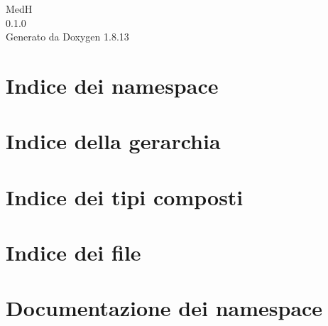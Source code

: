 \documentclass[twoside]{book}
\newcommand{\+}{\discretionary{\mbox{\scriptsize$\hookleftarrow$}}{}{}}
\newcommand{\clearemptydoublepage}{%
  \newpage{\pagestyle{empty}\cleardoublepage}%
}
\begin{document}
\hypersetup{pageanchor=false,
             bookmarksnumbered=true,
             pdfencoding=unicode
            }
\begin{titlepage}
\vspace*{7cm}
\begin{center}%
{\Large MedH \\[1ex]\large 0.\+1.\+0 }\\
\vspace*{1cm}
{\large Generato da Doxygen 1.8.13}\\
\end{center}
\end{titlepage}
\clearemptydoublepage
{}
\tableofcontents
\clearemptydoublepage
{}
\hypersetup{pageanchor=true}

\chapter{Indice dei namespace}

\chapter{Indice della gerarchia}

\chapter{Indice dei tipi composti}

\chapter{Indice dei file}

\chapter{Documentazione dei namespace}






\end{document}
